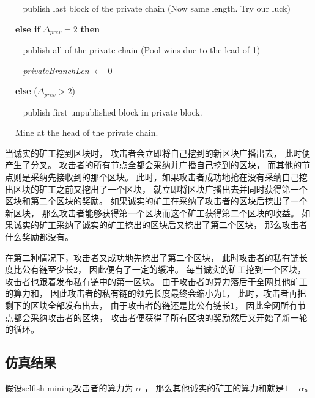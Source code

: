 \documentclass[a4paper, 11pt]{article}
\begin{document}
\begin{CJK*}{UTF8}{gbsn}
\begin{algorithm}
                $\ \ \ \ \ \ \ \ $ publish last block of the private chain \hfill (Now same length. Try our luck)

            $\ \ \ \ $ \textbf{else if} $\Delta_{\textit{prev}} = 2 $ \textbf{then}

                $\ \ \ \ \ \ \ \ $ publish all of the private chain \hfill (Pool wins due to the lead of 1)

                $\ \ \ \ \ \ \ \ $ \textit{privateBranchLen} $\leftarrow$ 0
            
            $\ \ \ \ $ \textbf{else} \hfill ($\Delta_{\textit{prev}} > 2$)

                $\ \ \ \ \ \ \ \ $ publish first unpublished block in private block.
            
            $\ \ \ \ $ Mine at the head of the private chain.

    \end{algorithm}

    当诚实的矿工挖到区块时，
    攻击者会立即将自己挖到的新区块广播出去，
    此时便产生了分叉。
    攻击者的所有节点全都会采纳并广播自己挖到的区块，
    而其他的节点则是采纳先接收到的那个区块。
    此时，如果攻击者成功地抢在没有采纳自己挖出区块的矿工之前又挖出了一个区块，
    就立即将区块广播出去并同时获得第一个区块和第二个区块的奖励。
    如果诚实的矿工在采纳了攻击者的区块后挖出了一个新区块，
    那么攻击者能够获得第一个区块而这个矿工获得第二个区块的收益。
    如果诚实的矿工采纳了诚实的矿工挖出的区块后又挖出了第二个区块，
    那么攻击者什么奖励都没有。

    在第二种情况下，攻击者又成功地先挖出了第二个区块，
    此时攻击者的私有链长度比公有链至少长2，
    因此便有了一定的缓冲。
    每当诚实的矿工挖到一个区块，
    攻击者也跟着发布私有链中的第一区块。
    由于攻击者的算力落后于全网其他矿工的算力和，
    因此攻击者的私有链的领先长度最终会缩小为1，
    此时，攻击者再把剩下的区块全部发布出去，
    由于攻击者的链还是比公有链长1，
    因此全网所有节点都会采纳攻击者的区块，
    攻击者便获得了所有区块的奖励然后又开始了新一轮的循环。

    \subsection{仿真结果}

    假设selfish mining攻击者的算力为 $ \alpha$ ，
    那么其他诚实的矿工的算力和就是$1 - \alpha$。
    

    \clearpage

    \begin{thebibliography}{8}


\end{thebibliography}
\end{CJK*}
\end{document}
